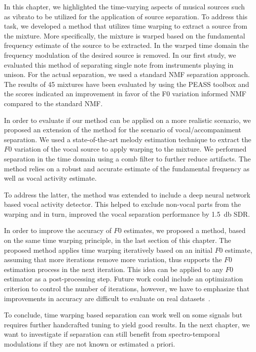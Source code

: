 In this chapter, we highlighted the time-varying aspects of musical sources such as vibrato to be utilized for the application of source separation.
To address this task, we developed a method that utilizes time warping to extract a source from the mixture.
More specifically, the mixture is warped based on the fundamental frequency estimate of the source to be extracted. 
In the warped time domain the frequency modulation of the desired source is removed. 
In our first study, we evaluated this method of separating single note from instruments playing in unison.
For the actual separation, we used a standard NMF separation approach.
The results of 45 mixtures have been evaluated by using the PEASS toolbox and the scores indicated an improvement in favor of the F0 variation informed NMF compared to the standard NMF.
\par
In order to evaluate if our method can be applied on a more realistic scenario, we proposed an extension of the method for the scenario of vocal/accompaniment separation.
We used a state-of-the-art melody estimation technique to extract the \(F0\) variation of the vocal source to apply warping to the mixture.
We performed separation in the time domain using a comb filter to further reduce artifacts.
The method relies on a robust and accurate estimate of the fundamental frequency as well as vocal activity estimate.
\par
To address the latter, the method was extended to include a deep neural network based vocal activity detector.
This helped to exclude non-vocal parts from the warping and in turn, improved the vocal separation performance by 1.5~\si{\decibel} SDR.
\par
In order to improve the accuracy of \(F0\) estimates, we proposed a method, based on the same time warping principle, in the last section of this chapter. 
The proposed method applies time warping iteratively based on an initial \(F0\) estimate, assuming that more iterations remove more variation, thus supports the \(F0\) estimation process in the next iteration.
This idea can be applied to any \(F0\) estimator as a post-processing step.
Future work could include an optimization criterion to control the number of iterations, however, we have to emphasize that improvements in accuracy are difficult to evaluate on real datasets~\cite{stoeter15acm}.
\par
To conclude, time warping based separation can work well on some signals but requires further handcrafted tuning to yield good results.
In the next chapter, we want to investigate if separation can still benefit from spectro-temporal modulations if they are not known or estimated a priori.